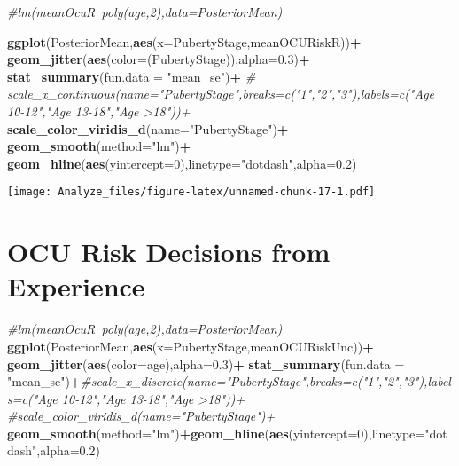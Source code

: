 \documentclass[]{article}
\newenvironment{Shaded}{\begin{snugshade}}{\end{snugshade}}
\newcommand{\KeywordTok}[1]{\textcolor[rgb]{0.13,0.29,0.53}{\textbf{#1}}}
\newcommand{\DataTypeTok}[1]{\textcolor[rgb]{0.13,0.29,0.53}{#1}}
\newcommand{\DecValTok}[1]{\textcolor[rgb]{0.00,0.00,0.81}{#1}}
\newcommand{\FloatTok}[1]{\textcolor[rgb]{0.00,0.00,0.81}{#1}}
\newcommand{\StringTok}[1]{\textcolor[rgb]{0.31,0.60,0.02}{#1}}
\newcommand{\CommentTok}[1]{\textcolor[rgb]{0.56,0.35,0.01}{\textit{#1}}}
\newcommand{\OperatorTok}[1]{\textcolor[rgb]{0.81,0.36,0.00}{\textbf{#1}}}
\newcommand{\NormalTok}[1]{#1}
\begin{document}
\begin{Shaded}
\begin{Highlighting}[]
\CommentTok{#lm(meanOcuR~poly(age,2),data=PosteriorMean)}

\KeywordTok{ggplot}\NormalTok{(PosteriorMean,}\KeywordTok{aes}\NormalTok{(}\DataTypeTok{x=}\NormalTok{PubertyStage,meanOCURiskR))}\OperatorTok{+}
\StringTok{  }\KeywordTok{geom_jitter}\NormalTok{(}\KeywordTok{aes}\NormalTok{(}\DataTypeTok{color=}\NormalTok{(PubertyStage)),}\DataTypeTok{alpha=}\FloatTok{0.3}\NormalTok{)}\OperatorTok{+}
\StringTok{  }\KeywordTok{stat_summary}\NormalTok{(}\DataTypeTok{fun.data =} \StringTok{"mean_se"}\NormalTok{)}\OperatorTok{+}
\StringTok{ }\CommentTok{# scale_x_continuous(name="PubertyStage",breaks=c("1","2","3"),labels=c("Age 10-12","Age 13-18","Age >18"))+}
\StringTok{  }\KeywordTok{scale_color_viridis_d}\NormalTok{(}\DataTypeTok{name=}\StringTok{"PubertyStage"}\NormalTok{)}\OperatorTok{+}
\StringTok{  }\KeywordTok{geom_smooth}\NormalTok{(}\DataTypeTok{method=}\StringTok{"lm"}\NormalTok{)}\OperatorTok{+}
\StringTok{  }\KeywordTok{geom_hline}\NormalTok{(}\KeywordTok{aes}\NormalTok{(}\DataTypeTok{yintercept=}\DecValTok{0}\NormalTok{),}\DataTypeTok{linetype=}\StringTok{"dotdash"}\NormalTok{,}\DataTypeTok{alpha=}\FloatTok{0.2}\NormalTok{)}
\end{Highlighting}
\end{Shaded}

\texttt{[image: Analyze\_files/figure-latex/unnamed-chunk-17-1.pdf]}

\section{OCU Risk Decisions from
Experience}\label{ocu-risk-decisions-from-experience}

\begin{Shaded}
\begin{Highlighting}[]
\CommentTok{#lm(meanOcuR~poly(age,2),data=PosteriorMean)}
\KeywordTok{ggplot}\NormalTok{(PosteriorMean,}\KeywordTok{aes}\NormalTok{(}\DataTypeTok{x=}\NormalTok{PubertyStage,meanOCURiskUnc))}\OperatorTok{+}
\StringTok{  }\KeywordTok{geom_jitter}\NormalTok{(}\KeywordTok{aes}\NormalTok{(}\DataTypeTok{color=}\NormalTok{age),}\DataTypeTok{alpha=}\FloatTok{0.3}\NormalTok{)}\OperatorTok{+}
\StringTok{  }\KeywordTok{stat_summary}\NormalTok{(}\DataTypeTok{fun.data =} \StringTok{"mean_se"}\NormalTok{)}\OperatorTok{+}\CommentTok{#scale_x_discrete(name="PubertyStage",breaks=c("1","2","3"),labels=c("Age 10-12","Age 13-18","Age >18"))+}
\StringTok{  }\CommentTok{#scale_color_viridis_d(name="PubertyStage")+}
\StringTok{  }\KeywordTok{geom_smooth}\NormalTok{(}\DataTypeTok{method=}\StringTok{"lm"}\NormalTok{)}\OperatorTok{+}\KeywordTok{geom_hline}\NormalTok{(}\KeywordTok{aes}\NormalTok{(}\DataTypeTok{yintercept=}\DecValTok{0}\NormalTok{),}\DataTypeTok{linetype=}\StringTok{"dotdash"}\NormalTok{,}\DataTypeTok{alpha=}\FloatTok{0.2}\NormalTok{)}
\end{Highlighting}
\end{Shaded}
\end{document}
